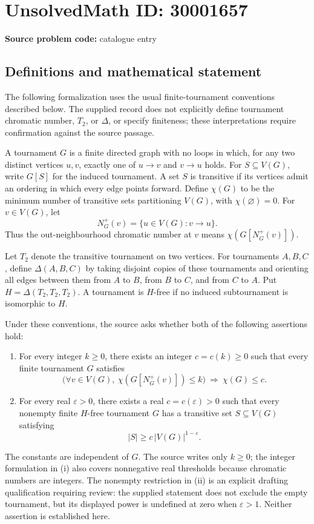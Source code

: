 \documentclass[11pt]{article}
\begin{document}
\section*{UnsolvedMath ID: 30001657}
\textbf{Source problem code:} catalogue entry
\subsection{Definitions and mathematical statement}
The following formalization uses the usual finite-tournament conventions described below. The supplied record does not explicitly define tournament chromatic number, \(T_2\), or \(\Delta\), or specify finiteness; these interpretations require confirmation against the source passage.

A tournament \(G\) is a finite directed graph with no loops in which, for any two distinct vertices \(u,v\), exactly one of \(u\to v\) and \(v\to u\) holds. For \(S\subseteq V(G)\), write \(G[S]\) for the induced tournament. A set \(S\) is transitive if its vertices admit an ordering in which every edge points forward. Define \(\chi(G)\) to be the minimum number of transitive sets partitioning \(V(G)\), with \(\chi(\varnothing)=0\). For \(v\in V(G)\), let
\[
N_G^+(v)=\{u\in V(G):v\to u\}.
\]
Thus the out-neighbourhood chromatic number at \(v\) means \(\chi(G[N_G^+(v)])\).

Let \(T_2\) denote the transitive tournament on two vertices. For tournaments \(A,B,C\), define \(\Delta(A,B,C)\) by taking disjoint copies of these tournaments and orienting all edges between them from \(A\) to \(B\), from \(B\) to \(C\), and from \(C\) to \(A\). Put \(H=\Delta(T_2,T_2,T_2)\). A tournament is \(H\)-free if no induced subtournament is isomorphic to \(H\).

Under these conventions, the source asks whether both of the following assertions hold:
\begin{enumerate}
\item For every integer \(k\geq0\), there exists an integer \(c=c(k)\geq0\) such that every finite tournament \(G\) satisfies
\[
\bigl(\forall v\in V(G),\ \chi(G[N_G^+(v)])\leq k\bigr)
\ \Longrightarrow\ \chi(G)\leq c.
\]
\item For every real \(\varepsilon>0\), there exists a real \(c=c(\varepsilon)>0\) such that every nonempty finite \(H\)-free tournament \(G\) has a transitive set \(S\subseteq V(G)\) satisfying
\[
|S|\geq c\,|V(G)|^{1-\varepsilon}.
\]
\end{enumerate}
The constants are independent of \(G\). The source writes only \(k\geq0\); the integer formulation in (i) also covers nonnegative real thresholds because chromatic numbers are integers. The nonempty restriction in (ii) is an explicit drafting qualification requiring review: the supplied statement does not exclude the empty tournament, but its displayed power is undefined at zero when \(\varepsilon>1\). Neither assertion is established here.
\end{document}

